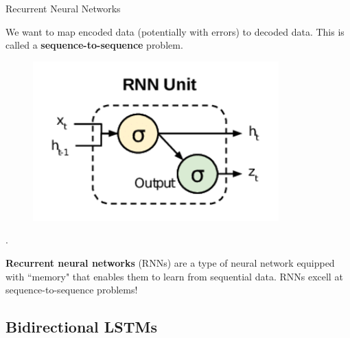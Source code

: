 \documentclass{beamer}
\newcommand{\<}				{\langle}
\renewcommand{\>}      		{\rangle}
\begin{document}
\begin{frame}{Recurrent Neural Networks}

We want to map encoded data (potentially with errors) to decoded data. This is called a \textbf{sequence-to-sequence} problem.

\medskip

\begin{figure}[h]
\includegraphics[scale=0.7]{rnn.png}
\end{figure}.

\medskip

\textbf{Recurrent neural networks} (RNNs) are a type of neural network equipped with ``memory" that enables them to learn from sequential data. RNNs excell at sequence-to-sequence problems!







\end{frame}

\subsection{Bidirectional LSTMs} 
\end{document}

